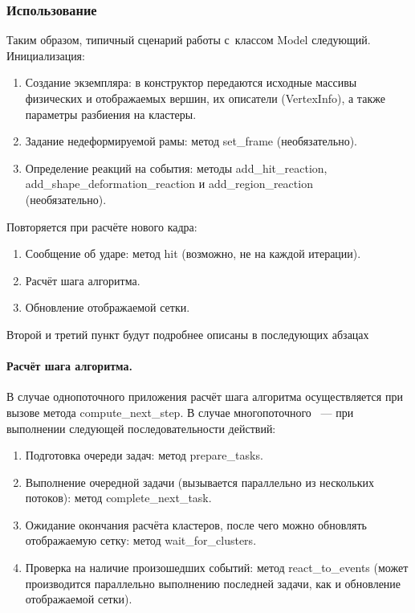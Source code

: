 \documentclass[a4paper, 14pt, titlepage]{extarticle}
\begin{document}
      \subsubsection{Использование}\label{sssec:usage}

        Таким образом, типичный сценарий работы с~классом Model следующий. Инициализация:
        \begin{enumerate}
          \item Создание экземпляра: в конструктор передаются исходные массивы физических и
          отображаемых вершин, их описатели (VertexInfo), а также параметры разбиения на кластеры.
          \item Задание недеформируемой рамы: метод set\_frame (необязательно).
          \item Определение реакций на события: методы add\_hit\_reaction,\\
          add\_shape\_deformation\_reaction и add\_region\_reaction\\
          (необязательно).
        \end{enumerate}
        Повторяется при расчёте нового кадра:
        \begin{enumerate}
          \item Сообщение об ударе: метод hit (возможно, не на каждой итерации).
          \item Расчёт шага алгоритма.
          \item Обновление отображаемой сетки.
        \end{enumerate}
        Второй и третий пункт будут подробнее описаны в последующих абзацах

        \paragraph{Расчёт шага алгоритма.}
        В случае однопоточного приложения расчёт шага алгоритма осуществляется при вызове метода
        compute\_next\_step. В случае многопоточного ~--- при выполнении следующей
        последовательности действий:
        \begin{enumerate}
          \item Подготовка очереди задач: метод prepare\_tasks.
          \item Выполнение очередной задачи (вызывается параллельно из нескольких потоков): метод complete\_next\_task.
          \item Ожидание окончания расчёта кластеров, после чего можно
            обновлять отображаемую сетку: метод wait\_for\_clusters.
          \item Проверка на наличие произошедших событий: метод
            react\_to\_events (может производится параллельно выполнению последней задачи,
            как и обновление отображаемой сетки).
        \end{enumerate}
\end{document}
